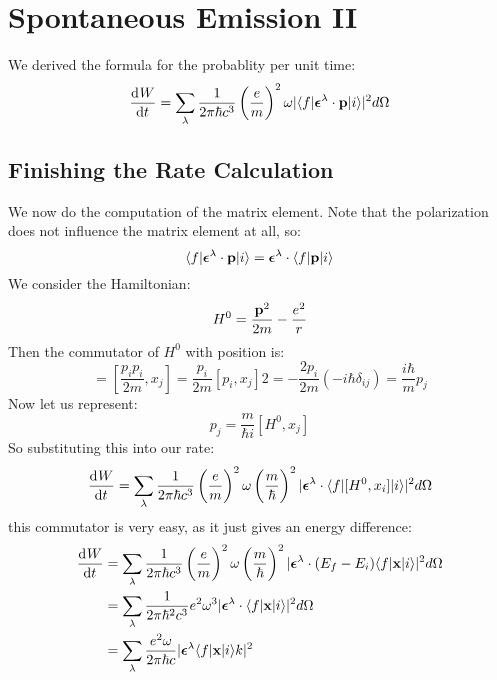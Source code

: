 \section{Spontaneous Emission II}
We derived the formula for the probablity per unit time:
\begin{equation}
    \dod{W}{t} = \sum_\lambda \frac{1}{2\pi\hbar c^3}\left(\frac{e}{m}\right)^2\omega\abs{\bra{f}\gv{\e}^\lambda \cdot \v{p}\ket{i}}^2d\Omega
\end{equation}

\subsection{Finishing the Rate Calculation}
We now do the computation of the matrix element. Note that the polarization does not influence the matrix element at all, so:
\begin{equation}
    \langle f \rvert\mbox{\boldmath$ \epsilon $}^\lambda \cdot \mathbf{p}\lvert i \rangle = \mbox{\boldmath$ \epsilon $}^\lambda \cdot \langle f \rvert\mathbf{p}\lvert i \rangle
\end{equation}
We consider the Hamiltonian:
\begin{equation}
    H^0 = \frac{\mathbf{p}^2}{2m} - \frac{e^2}{r}
\end{equation}
Then the commutator of $H^0$ with position is:
\begin{equation}
    [H^0, x_j] = [\frac{p_ip_i}{2m}, x_j] = \frac{p_i}{2m}[p_i, x_j]2 = -\frac{2p_i}{2m}\left(-i\hbar\delta_{ij}\right) = \frac{i\hbar}{m}p_j
\end{equation}
Now let us represent:
\begin{equation}
    p_j = \frac{m}{\hbar i}[H^0, x_j]
\end{equation}
So substituting this into our rate:
\begin{equation}
    \dod{W}{t} = \sum_\lambda \frac{1}{2\pi\hbar c^3}\left(\frac{e}{m}\right)^2\omega\left(\frac{m}{\hbar}\right)^2\abs{\gv{\e}^\lambda \cdot \bra{f}[H^0, x_i]\ket{i}}^2d\Omega
\end{equation}
this commutator is very easy, as it just gives an energy difference:
\begin{equation}
    \begin{split}
        \dod{W}{t} &= \sum_\lambda \frac{1}{2\pi\hbar c^3}\left(\frac{e}{m}\right)^2\omega\left(\frac{m}{\hbar}\right)^2\abs{\gv{\e}^\lambda \cdot (E_f - E_i)\bra{f}\v{x}\ket{i}}^2d\Omega
        \\ &= \sum_\lambda \frac{1}{2\pi\hbar^2c^3}e^2\omega^3\abs{\gv{\e}^\lambda\cdot\bra{f}\v{x}\ket{i}}^2d\Omega
        \\ &= \sum_\lambda \frac{e^2\omega}{2\pi\hbar c}\abs{\gv{\e}^\lambda \bra{f}\v{x}\ket{i}k}^2
    \end{split}
\end{equation}
